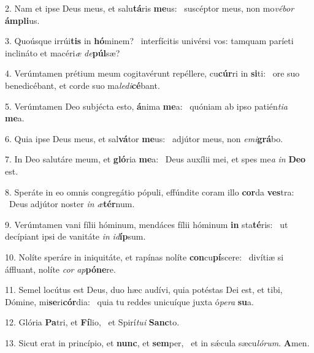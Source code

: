 2. Nam et ipse Deus meus, et salu\textbf{tá}ris \textbf{me}us: \ast\  suscéptor meus, non mo\textit{vé}\textit{bor} \textbf{ám}\textbf{pli}us.\

3. Quoúsque irrúi\textbf{tis} in \textbf{hó}minem? \ast\  interfícitis univérsi vos: tamquam paríeti inclináto et macéri\textit{æ} \textit{de}\textbf{púl}sæ?\

4. Verúmtamen prétium meum cogitavérunt repéllere, cu\textbf{cúr}ri in \textbf{si}ti: \ast\  ore suo benedicébant, et corde suo ma\textit{le}\textit{di}\textbf{cé}bant.\

5. Verúmtamen Deo subjécta esto, \textbf{á}nima \textbf{me}a: \ast\  quóniam ab ipso patién\textit{ti}\textit{a} \textbf{me}a.\

6. Quia ipse Deus meus, et sal\textbf{vá}tor \textbf{me}us: \ast\  adjútor meus, non \textit{e}\textit{mi}\textbf{grá}bo.\

7. In Deo salutáre meum, et \textbf{gló}ria \textbf{me}a: \ast\  Deus auxílii mei, et spes me\textit{a} \textit{in} \textbf{De}\textbf{o} est.\

8. Speráte in eo omnis congregátio pópuli, effúndite coram illo \textbf{cor}da \textbf{ves}tra: \ast\  Deus adjútor noster \textit{in} \textit{æ}\textbf{tér}num.\

9. Verúmtamen vani fílii hóminum, mendáces fílii hóminum \textbf{in} sta\textbf{té}ris: \ast\  ut decípiant ipsi de vanitáte \textit{in} \textit{id}\textbf{íp}sum.\

10. Nolíte speráre in iniquitáte, et rapínas nolíte \textbf{con}cu\textbf{pí}scere: \ast\  divítiæ si áffluant, nolíte \textit{cor} \textit{ap}\textbf{pó}\textbf{ne}re.\

11. Semel locútus est Deus, duo hæc audívi, quia potéstas Dei est, et tibi, Dómine, mi\textbf{se}ri\textbf{cór}dia: \ast\  quia tu reddes unicuíque juxta ó\textit{pe}\textit{ra} \textbf{su}a.\

12. Glória \textbf{Pa}tri, et \textbf{Fí}lio, \ast\  et Spirí\textit{tu}\textit{i} \textbf{Sanc}to.\

13. Sicut erat in princípio, et \textbf{nunc}, et \textbf{sem}per, \ast\  et in sǽcula sæcu\textit{ló}\textit{rum}. \textbf{A}men.\

